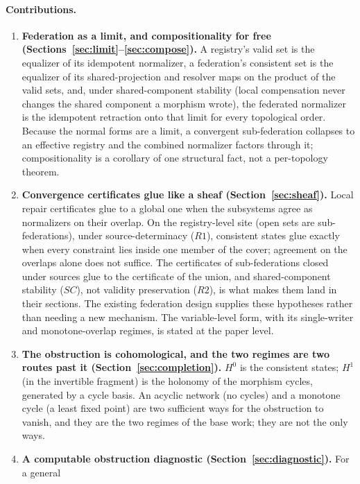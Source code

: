 \documentclass[11pt,a4paper]{article}
\theoremstyle{plain}
\theoremstyle{definition}
\theoremstyle{remark}
\newcommand{\Hz}{H^0}
\newcommand{\Ho}{H^1}
\renewcommand{\_}{\origunderscore\allowbreak}
\begin{document}
\paragraph{Contributions.}
\begin{enumerate}[leftmargin=*]
\item \textbf{Federation as a limit, and compositionality for free
  (Sections~\ref{sec:limit}--\ref{sec:compose}).} A registry's valid set is the equalizer of its
  idempotent normalizer, a federation's consistent set is the equalizer of its shared-projection and
  resolver maps on the product of the valid sets, and, under shared-component stability (local
  compensation never changes the shared component a morphism wrote), the federated normalizer is the
  idempotent retraction onto that limit for every topological order. Because the normal forms are a
  limit, a convergent sub-federation collapses to an effective registry and the combined normalizer
  factors through it; compositionality is a corollary of one structural fact, not a per-topology
  theorem.
\item \textbf{Convergence certificates glue like a sheaf (Section~\ref{sec:sheaf}).} Local repair
  certificates glue to a global one when the subsystems agree as normalizers on their overlap. On the
  registry-level site (open sets are sub-federations), under source-determinacy ($R1$), consistent
  states glue exactly when every constraint lies inside one member of the cover; agreement on the
  overlaps alone does not suffice. The certificates of sub-federations closed under sources glue to
  the certificate of the union, and shared-component stability ($SC$), not validity preservation
  ($R2$), is what makes them land in their sections. The existing federation design supplies these
  hypotheses rather than needing a new mechanism. The variable-level form, with its single-writer
  and monotone-overlap regimes, is stated at the paper level.
\item \textbf{The obstruction is cohomological, and the two regimes are two routes past it
  (Section~\ref{sec:completion}).} $\Hz$ is the consistent states; $\Ho$ (in the invertible fragment)
  is the holonomy of the morphism cycles, generated by a cycle basis. An acyclic network (no cycles)
  and a monotone cycle (a least fixed point) are two sufficient ways for the obstruction to vanish,
  and they are the two regimes of the base work; they are not the only ways.
\item \textbf{A computable obstruction diagnostic (Section~\ref{sec:diagnostic}).} For a general

\end{enumerate}
\end{document}
